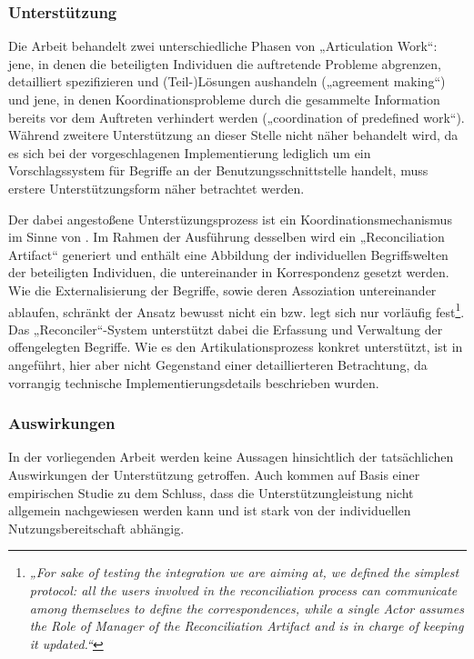 \subsubsection{Unterstützung}

Die Arbeit behandelt zwei unterschiedliche Phasen von „Articulation Work“: jene, in denen die beteiligten Individuen die auftretende Probleme abgrenzen, detailliert spezifizieren und (Teil-)Lösungen aushandeln („agreement making“) und jene, in denen Koordinationsprobleme durch die gesammelte Information bereits vor dem Auftreten verhindert werden („coordination of predefined work“). Während zweitere Unterstützung an dieser Stelle nicht näher behandelt wird, da es sich bei der vorgeschlagenen Implementierung lediglich um ein Vorschlagssystem für Begriffe an der Benutzungsschnittstelle handelt, muss erstere Unterstützungsform näher betrachtet werden.

Der dabei angestoßene Unterstüzungsprozess ist ein Koordinationsmechanismus im Sinne von \citet{Divitini00}. Im Rahmen der Ausführung desselben wird ein „Reconciliation Artifact“ generiert und enthält eine Abbildung der individuellen Begriffswelten der beteiligten Individuen, die untereinander in Korrespondenz gesetzt werden. Wie die Externalisierung der Begriffe, sowie deren Assoziation untereinander ablaufen, schränkt der Ansatz bewusst nicht ein bzw. legt sich nur vorläufig fest\footnote{\emph{„For sake of testing the integration we are aiming at, we defined the simplest protocol: all the users involved in the reconciliation process can communicate among themselves to define the correspondences, while a single Actor assumes the Role of Manager of the Reconciliation Artifact and is in charge of keeping it updated.“}\citep[][S. 10]{Sarini02}}. Das „Reconciler“-System unterstützt dabei die Erfassung und Verwaltung der offengelegten Begriffe. Wie es den Artikulationsprozess konkret unterstützt, ist in \citet{Mark02a} angeführt, hier aber nicht Gegenstand einer detaillierteren Betrachtung, da vorrangig technische Implementierungsdetails beschrieben wurden.

\subsubsection{Auswirkungen}

In der vorliegenden Arbeit werden keine Aussagen hinsichtlich der tatsächlichen Auswirkungen der Unterstützung getroffen. Auch \citet{Mark02a} kommen auf Basis einer empirischen Studie zu dem Schluss, dass die Unterstützungleistung nicht allgemein nachgewiesen werden kann und ist stark von der individuellen Nutzungsbereitschaft abhängig.


